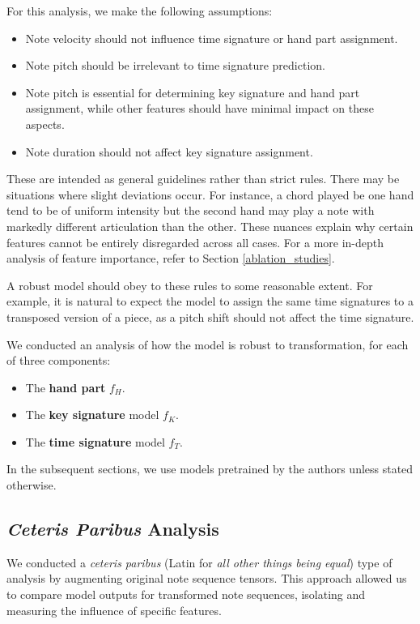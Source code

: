 For this analysis, we make the following assumptions: \begin{itemize}
	\item Note velocity should not influence time signature or hand part assignment.
	\item Note pitch should be irrelevant to time signature prediction.
	\item Note pitch is essential for determining key signature and hand part assignment, while other features should have minimal impact on these aspects.\
	\item Note duration should not affect key signature assignment.
\end{itemize} These are intended as general guidelines rather than strict rules. There may be situations where slight deviations occur. For instance, a chord played be one hand tend to be of uniform intensity but the second hand may play a note with markedly different articulation than the other. These nuances explain why certain features cannot be entirely disregarded across all cases. For a more in-depth analysis of feature importance, refer to Section \ref{ablation_studies}.

A robust model should obey to these rules to some reasonable extent. For example, it is natural  to expect the model to assign the same time signatures to a transposed version of a piece, as a pitch shift should not affect the time signature.

We conducted an analysis of how the model is robust to transformation, for each of three components: \begin{itemize}
	\item The \textbf{hand part} $f_H$.
	\item The \textbf{key signature} model $f_K$.
	\item The \textbf{time signature} model $f_T$.
\end{itemize} In the subsequent sections, we use models pretrained by the authors unless stated otherwise.

\subsection{\emph{Ceteris Paribus} Analysis}

We conducted a \emph{ceteris paribus} (Latin for \emph{all other things being equal}) type of analysis by augmenting original note sequence tensors. This approach allowed us to compare model outputs for transformed note sequences, isolating and measuring the influence of specific features.

